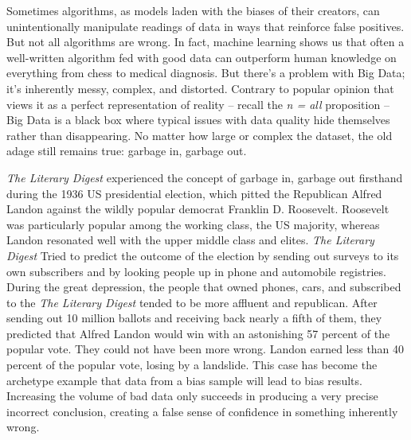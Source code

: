 \documentclass[sigconf]{acmart}
\begin{document}
Sometimes algorithms, as models laden with the biases of their creators, can unintentionally manipulate readings of data in ways that reinforce false positives. But not all algorithms are wrong. In fact, machine learning shows us that often a well-written algorithm fed with good data can outperform human knowledge on everything from chess to medical diagnosis. But there's a problem with Big Data; it's inherently messy, complex, and distorted. Contrary to popular opinion that views it as a perfect representation of reality -- recall the {\em n = all} proposition -- Big Data is a black box where typical issues with data quality hide themselves rather than disappearing. No matter how large or complex the dataset, the old adage still remains true: garbage in, garbage out. 

{\em The Literary Digest} experienced the concept of garbage in, garbage out firsthand during the 1936 US presidential election, which pitted the Republican Alfred Landon against the wildly popular democrat Franklin D. Roosevelt. Roosevelt was particularly popular among the working class, the US majority, whereas Landon resonated well with the upper middle class and elites\cite{Harford2014}. {\em The Literary Digest} Tried to predict the outcome of the election by sending out surveys to its own subscribers and by looking people up in phone and automobile registries. During the great depression, the people that owned phones, cars, and subscribed to the  {\em The Literary Digest} tended to be more affluent and republican. After sending out 10 million ballots and receiving back nearly a fifth of them, they predicted that Alfred Landon would win with an astonishing 57 percent of the popular vote. They could not have been more wrong. Landon earned less than 40 percent of the popular vote, losing by a landslide\cite{Crossen2006}. This case has become the archetype example that data from a bias sample will lead to bias results. Increasing the volume of bad data only succeeds in producing a very precise incorrect conclusion, creating a false sense of confidence in something inherently wrong.
\end{document}
